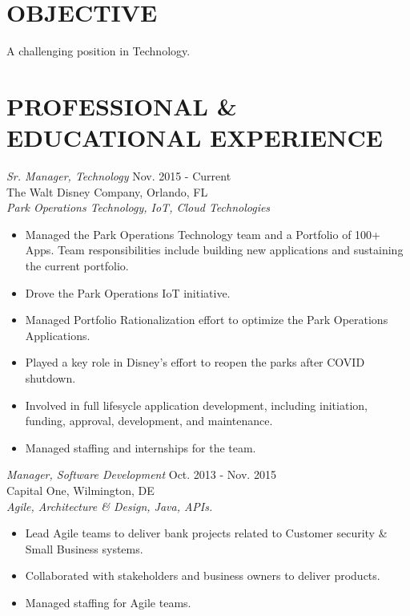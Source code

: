 \documentclass[line,margin]{res}
\begin{document}
\address{407.601.9424 - ghaitho@gmail.com}

\begin{resume}

\section{OBJECTIVE}
A challenging position in Technology.

\section{PROFESSIONAL \& EDUCATIONAL EXPERIENCE}

{\sl Sr. Manager, Technology} \hfill        Nov. 2015 - Current  \\
The Walt Disney Company, Orlando, FL \\
  \textit{Park Operations Technology, IoT, Cloud Technologies}
  \begin{itemize} \itemsep -2pt %
      \item Managed the Park Operations Technology team and a Portfolio of 100+ Apps.
      Team responsibilities include building new applications and sustaining
      the current portfolio.
      \item Drove the Park Operations IoT initiative.
      \item Managed Portfolio Rationalization effort to optimize the Park Operations
      Applications.
      \item Played a key role in Disney's effort to reopen the parks after
      COVID shutdown.
      \item Involved in full lifesycle application development, including
      initiation, funding, approval, development, and maintenance.
      \item Managed staffing and internships for the team.
      \end{itemize}

{\sl Manager, Software Development} \hfill        Oct. 2013 - Nov. 2015  \\
Capital One, Wilmington, DE \\
  \textit{Agile, Architecture \& Design, Java, APIs.}
  \begin{itemize} \itemsep -2pt %
      \item Lead Agile teams to deliver bank projects related to Customer
      security \& Small Business systems.
      \item Collaborated with stakeholders and business owners to deliver
       products.
      \item  Managed staffing for Agile teams.
 \end{itemize}


\end{resume}
\end{document}
